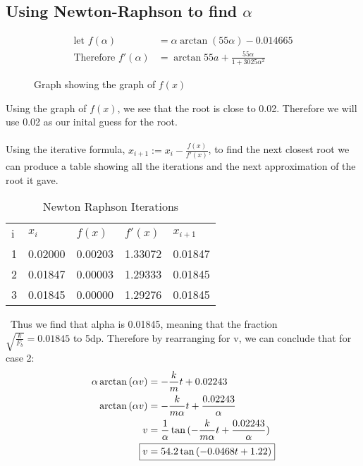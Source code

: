 \subsection{Using Newton-Raphson to find $\alpha$}
\begin{align*}
    \text{let } f(\alpha) &= \alpha \arctan{(55\alpha)} - 0.014665
    \\ \text{Therefore } f'(\alpha) &= \arctan{55a} + \frac{55\alpha}{1+3025\alpha^2}
\end{align*}

\begin{figure}[H]
\centering

\caption{Graph showing the graph of $f(x)$}
\end{figure}

Using the graph of $f(x)$, we see that the root is close to 0.02. Therefore we will use 0.02 as our inital guess for the root.
\\ \\
Using the iterative formula, $x_{i+1} := x_{i}-\frac{f(x)}{f'(x)}$, to find the next closest root we can produce a table showing all the iterations and the next approximation of the root it gave.


\begin{table}[h]
\centering
    \begin{tabular}{|l|l|l|l|l|}
        \hline
        i & $x_i$ & $f(x)$ & $f'(x)$ & $x_{i+1}$ \\ \cline{1-5}
        1 & 0.02000 & 0.00203 & 1.33072 & 0.01847 \\ \cline{1-5}
        2 & 0.01847 & 0.00003 & 1.29333 & 0.01845 \\ \cline{1-5}
        3 & 0.01845 & 0.00000 & 1.29276 & 0.01845 \\ \cline{1-5}
    \end{tabular}
    \caption{Newton Raphson Iterations}
\end{table}
\
Thus we find that alpha is 0.01845, meaning that the fraction \\ $\sqrt{\frac{k}{F_b}} = 0.01845$ to 5dp.
\newline \newline
Therefore by rearranging for v, we can conclude that for case 2:
\begin{align*}
    \alpha \arctan{(\alpha v)} &= -\frac{k}{m}t + 0.02243
    \\ \arctan{(\alpha v)} &= -\frac{k}{m\alpha}t + \frac{0.02243}{\alpha}
    \\ v &= \frac{1}{\alpha} \tan{(-\frac{k}{m\alpha}t + \frac{0.02243}{\alpha})}
    \\ \Aboxed{v &=  54.2\tan{(-0.0468t + 1.22)}}
\end{align*}

